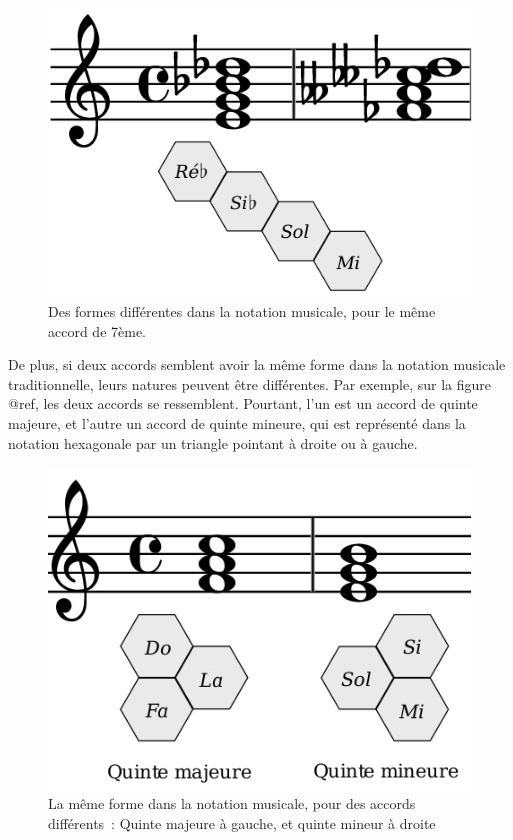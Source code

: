 \documentclass[
]{book}
\begin{document}
\begin{figure}
\centering
\includegraphics{img/trad1.png}
\caption{\label{fig:trad1}Des formes différentes dans la
notation musicale, pour le même accord de 7ème.}
\end{figure}

De plus, si deux accords semblent avoir la même forme dans la notation
musicale traditionnelle, leurs natures peuvent être différentes. Par exemple,
sur la figure @ref\label{fig:trad2}, les deux accords
se ressemblent. Pourtant, l'un est un accord de quinte majeure, et l'autre un
accord de quinte mineure, qui est représenté dans la notation hexagonale par
un triangle pointant à droite ou à gauche.

\begin{figure}
\centering
\includegraphics{img/trad2.png}
\caption{\label{fig:trad2}La même forme dans la notation musicale,
pour des accords différents~: Quinte majeure à gauche, et quinte
mineur à droite}
\end{figure}
\end{document}
